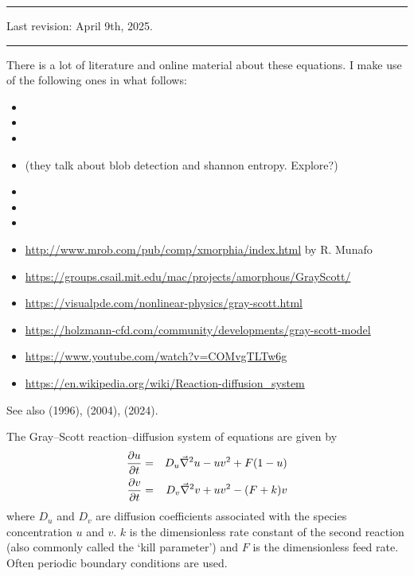 \par\noindent\rule{\textwidth}{0.4pt}

Last revision: April 9th, 2025.

\par\noindent\rule{\textwidth}{0.4pt}


There is a lot of literature and online material about these equations. I make use of the following 
ones in what follows:
\begin{itemize}
\item {}
\item {}
\item {}
\item {} (they talk about blob detection and shannon entropy. Explore?)
\item {}
\item {}
\item {}
\item \url{http://www.mrob.com/pub/comp/xmorphia/index.html} by R. Munafo
\item \url{https://groups.csail.mit.edu/mac/projects/amorphous/GrayScott/}
\item \url{https://visualpde.com/nonlinear-physics/gray-scott.html}
\item \url{https://holzmann-cfd.com/community/developments/gray-scott-model}
\item \url{https://www.youtube.com/watch?v=COMvgTLTw6g}
\item \url{https://en.wikipedia.org/wiki/Reaction-diffusion_system}
\end{itemize}

See also \textcite{marm96} (1996), \textcite{mcri04} (2004), \textcite{jilw24} (2024).

\vspace{.6cm}

The Gray–Scott reaction–diffusion system of equations are given by
\begin{eqnarray}
\frac{\partial u}{\partial t} &=& D_u \vec\nabla^2 u - uv^2 + F(1-u) \nonumber\\
\frac{\partial v}{\partial t} &=& D_v \vec\nabla^2 v + uv^2 - (F+k)v
\end{eqnarray}
where $D_u$ and $D_v$ are diffusion coefficients associated with the species concentration $u$
and $v$. $k$ is the dimensionless rate constant of the second reaction (also commonly called the `kill 
parameter') and $F$ is the dimensionless feed rate.
Often periodic boundary conditions are used. 

